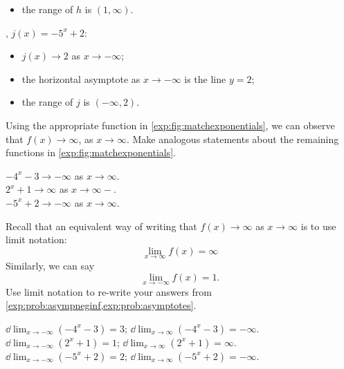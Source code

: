 \begin{exercises}
\begin{problem}
\begin{subproblem}
\begin{shortsolution}
\begin{itemize}
			\item the range of $h$ is $(1,\infty)$.
		\end{itemize}
		, $j(x)=-5^x+2$: 
		\begin{itemize}
			\item $j(x)\to 2$ as $x\to-\infty$;
			\item the horizontal asymptote as $x\to-\infty$ is the line $y=2$;
			\item the range of $j$ is $(-\infty,2)$.
		\end{itemize}
	\end{shortsolution}
\end{subproblem}
\begin{subproblem}\label{exp:prob:asymptotes}
	Using the appropriate function in \cref{exp:fig:matchexponentials}, we can observe that
	$f(x)\to \infty$, as $x\to\infty$.
	Make analogous statements about the remaining functions in \cref{exp:fig:matchexponentials}.
	\begin{shortsolution}
		$-4^x-3\to -\infty$ as $x\to\infty$.\\ 
		$2^x+1\to \infty$ as $x\to\infty-$.\\
		$-5^x+2\to -\infty$ as $x\to\infty$.	  	  
	\end{shortsolution}
\end{subproblem}
\begin{subproblem}
	Recall that an equivalent way of writing that $f(x)\to \infty$ as $x\to \infty$ is to use limit notation:
	\[
		\lim_{x\to\infty}f(x)=\infty
	\]
	Similarly, we can say 
	\[
		\lim_{x\to-\infty}f(x)=1.
	\]
	Use limit notation to re-write your answers from \cref{exp:prob:asympneginf,exp:prob:asymptotes}.
	\begin{shortsolution}
		$\dd\lim_{x\to-\infty}(-4^x-3)=3$;     $\dd\lim_{x\to\infty}(-4^x-3)= -\infty$.	\\  	    
		$\dd\lim_{x\to-\infty}(2^x+1)=1$;     $\dd\lim_{x\to\infty}(2^x+1)= \infty$.	\\  	    
		$\dd\lim_{x\to-\infty}(-5^x+2) =2$;     $\dd\lim_{x\to\infty}(-5^x+2)= -\infty$.
	\end{shortsolution}
\end{subproblem}
\end{problem}


\end{exercises}
